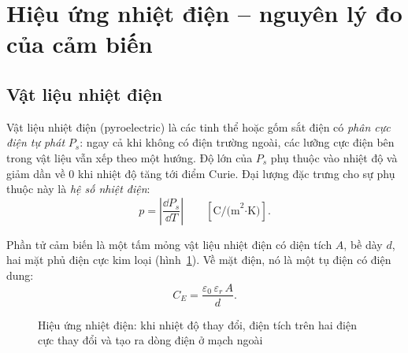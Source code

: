 \section{Hiệu ứng nhiệt điện -- nguyên lý đo của cảm biến}
\label{sec:hieuung}

\subsection{Vật liệu nhiệt điện}

Vật liệu nhiệt điện (pyroelectric) là các tinh thể hoặc gốm sắt điện có \emph{phân cực điện tự phát} $P_s$: ngay cả khi không có điện trường ngoài, các lưỡng cực điện bên trong vật liệu vẫn xếp theo một hướng. Độ lớn của $P_s$ phụ thuộc vào nhiệt độ và giảm dần về 0 khi nhiệt độ tăng tới điểm Curie. Đại lượng đặc trưng cho sự phụ thuộc này là \emph{hệ số nhiệt điện}:
\begin{equation}
  p = \left|\frac{\dd P_s}{\dd T}\right| \qquad [\text{C/(m}^2\text{·K)}].
  \label{eq:pyrocoef}
\end{equation}

Phần tử cảm biến là một tấm mỏng vật liệu nhiệt điện có diện tích $A$, bề dày $d$, hai mặt phủ điện cực kim loại (hình~\ref{fig:pyroeffect}). Về mặt điện, nó là một tụ điện có điện dung:
\begin{equation}
  C_E = \frac{\varepsilon_0\,\varepsilon_r\,A}{d}.
  \label{eq:CE}
\end{equation}

\begin{figure}[!htb]
\centering
{}
\caption{Hiệu ứng nhiệt điện: khi nhiệt độ thay đổi, điện tích trên hai điện cực thay đổi và tạo ra dòng điện ở mạch ngoài}
\label{fig:pyroeffect}
\end{figure}

